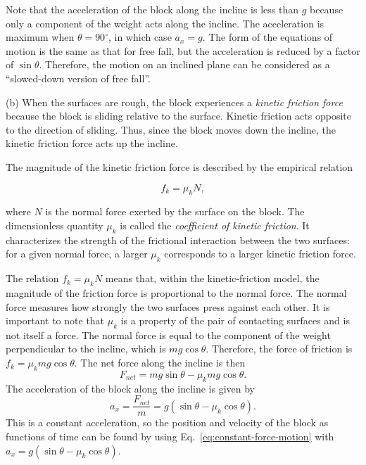 \documentclass[../main.tex]{subfiles}
\begin{document}
Note that the acceleration of the block along the incline is less than $g$ because only a component of the weight acts along the incline. The acceleration is maximum when $\theta = 90^\circ$, in which case $a_x = g$. The form of the equations of motion is the same as that for free fall, but the acceleration is reduced by a factor of $\sin\theta$. Therefore, the motion on an inclined plane can be considered as a ``slowed-down version of free fall''.

(b) When the surfaces are rough, the block experiences a \emph{kinetic friction force} because the block is sliding relative to the surface. Kinetic friction acts opposite to the direction of sliding. Thus, since the block moves down the incline, the kinetic friction force acts up the incline.

The magnitude of the kinetic friction force is described by the empirical relation

\begin{equation}
f_k=\mu_k N,
\end{equation}

where $N$ is the normal force exerted by the surface on the block. The dimensionless quantity $\mu_k$ is called the \emph{coefficient of kinetic friction}. It characterizes the strength of the frictional interaction between the two surfaces: for a given normal force, a larger $\mu_k$ corresponds to a larger kinetic friction force.

The relation $f_k=\mu_kN$ means that, within the kinetic-friction model, the magnitude of the friction force is proportional to the normal force. The normal force measures how strongly the two surfaces press against each other. It is important to note that $\mu_k$ is a property of the pair of contacting surfaces and is not itself a force. The normal force is equal to the component of the weight perpendicular to the incline, which is $mg\cos\theta$. Therefore, the force of friction is $f_k = \mu_k mg\cos\theta$. The net force along the incline is then
\begin{equation}
    F_{net} = mg\sin\theta - \mu_k mg\cos\theta.
\end{equation}
The acceleration of the block along the incline is given by
\begin{equation}
    a_x = \frac{F_{net}}{m} = g(\sin\theta - \mu_k \cos\theta).
\end{equation}
This is a constant acceleration, so the position and velocity of the block as functions of time can be found by using Eq.~\eqref{eq:constant-force-motion} with $a_x = g(\sin\theta - \mu_k \cos\theta)$.
\end{document}
